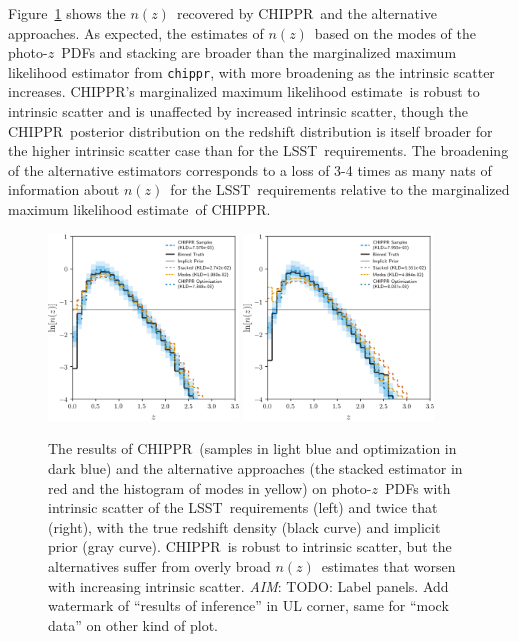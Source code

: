\documentclass[iop]{emulateapj}
\newcommand{\todo}[3]{{\color{#2}\emph{#1}: #3}}
\newcommand{\aim}[1]{\todo{AIM}{red}{#1}}
\newcommand{\Fig}[1]{Figure~\ref{#1}}
\newcommand{\project}[1]{\textsc{#1}}
\newcommand{\lsst}{\project{LSST}}
\newcommand{\Chippr}{\project{CHIPPR}}%
\newcommand{\repo}[1]{\texttt{#1}}
\newcommand{\chippr}{\repo{chippr}}
\newcommand{\pz}{photo-$z$}
\newcommand{\pzpdf}{\pz\ PDF}%
\newcommand{\nz}{$n(z)$}
\newcommand{\mmle}{marginalized maximum likelihood estimate}%
\begin{document}
\Fig{fig:results-scatter} shows the \nz\ recovered by \Chippr\ and the alternative approaches.
As expected, the estimates of \nz\ based on the modes of the \pzpdf s and stacking are broader than the marginalized maximum likelihood estimator from \chippr, with more broadening as the intrinsic scatter increases.
\Chippr's \mmle\ is robust to intrinsic scatter and is unaffected by increased intrinsic scatter, though the \Chippr\ posterior distribution on the redshift distribution is itself broader for the higher intrinsic scatter case than for the \lsst\ requirements.
The broadening of the alternative estimators corresponds to a loss of 3-4 times as many nats of information about \nz\ for the \lsst\ requirements relative to the \mmle\ of \Chippr.

\begin{figure}
	\begin{center}
	\includegraphics[width=0.45\textwidth]{figures/chippr/results_scatter1.png}
	\includegraphics[width=0.45\textwidth]{figures/chippr/results_scatter2.png}
	\caption{
		The results of \Chippr\ (samples in light blue and optimization in dark blue) and the alternative approaches (the stacked estimator in red and the histogram of modes in yellow) on \pzpdf s with intrinsic scatter of the \lsst\ requirements (left) and twice that (right), with the true redshift density (black curve) and implicit prior (gray curve).
		\Chippr\ is robust to intrinsic scatter, but the alternatives suffer from overly broad \nz\ estimates that worsen with increasing intrinsic scatter.
		\aim{TODO: Label panels.
		Add watermark of ``results of inference'' in UL corner, same for ``mock data'' on other kind of plot.}
	}
	\label{fig:results-scatter}
	\end{center}
\end{figure}
\end{document}
